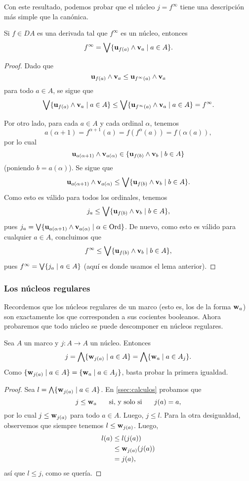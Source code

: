 Con este resultado, podemos probar que el núcleo $j=f^\infty$
tiene una descripción más simple que la canónica.

\begin{lemma}
  Si $f\in DA$ es una derivada tal que $f^\infty$ es un núcleo,
  entonces
  \[
    f^\infty = \bigvee\{\mathbf u_{f(a)}\wedge\mathbf v_{a} \mid a\in A\}
  .\]
\end{lemma}
\begin{proof}
  Dado que
  \[
    \mathbf u_{f(a)}\wedge\mathbf v_{a}\leq \mathbf u_{f^\infty(a)}\wedge\mathbf v_{a}
  \]
  para todo $a\in A$, se sigue que
  \[
    \bigvee\{\mathbf u_{f(a)}\wedge\mathbf v_{a} \mid a\in A\}
    \leq
    \bigvee\{\mathbf u_{f^\infty(a)}\wedge\mathbf v_{a} \mid a\in A\}
    = f^\infty
  .\]

  Por otro lado, para cada $a\in A$ y cada ordinal $\alpha$, tenemos
  \[
    a(\alpha+1)=f^{\alpha+1}(a)=f(f^\alpha(a))=f(\alpha(a))
  ,\]
  por lo cual
  \[
     \mathbf u_{a(\alpha+1)}\wedge\mathbf v_{a(\alpha)}
     \in
     \{\mathbf u_{f(b)}\wedge\mathbf v_{b} \mid b\in A\}
  \]
  (poniendo $b=a(\alpha)$).
  Se sigue que
  \[
     \mathbf u_{a(\alpha+1)}\wedge\mathbf v_{a(\alpha)}
     \leq
     \bigvee\{\mathbf u_{f(b)}\wedge\mathbf v_{b} \mid b\in A\}
  .\]
  Como esto es válido para todos los ordinales, tenemos
  \[
     j_a\leq \bigvee\{\mathbf u_{f(b)}\wedge\mathbf v_{b} \mid b\in A\}
  ,\]
  pues $j_a = \bigvee\{\mathbf u_{a(\alpha+1)}\wedge\mathbf v_{a(\alpha)}
   \mid\alpha\in\mathrm{Ord}\}$.
  De nuevo, como esto es válido para cualquier $a\in A$, concluimos
  que
  \[
     f^\infty\leq \bigvee\{\mathbf u_{f(b)}\wedge\mathbf v_{b} \mid b\in A\}
  ,\]
  pues $f^\infty = \bigvee\{j_a\mid a\in A\}$ (aquí es donde usamos
  el lema anterior).
\end{proof}

\subsubsection{Los núcleos regulares}

Recordemos que los núcleos regulares de un marco
(esto es, los de la forma $\mathbf w_{a}$) son exactamente
los que corresponden a sus cocientes booleanos.
Ahora probaremos que todo núcleo se puede descomponer en
núcleos regulares.

\begin{thm}
    Sea $A$ un marco y $j:A\to A$ un núcleo.
    Entonces
    \[
        j
        = \bigwedge\{\mathbf w_{j(a)}\mid a\in A\}
        = \bigwedge\{\mathbf w_{a}\mid a\in A_j\}
    .\]
    Como $\{\mathbf w_{j(a)}\mid a\in A\}=\{\mathbf w_{a} \mid a\in A_j\}$,
    basta probar la primera igualdad.
\end{thm}
\begin{proof}
    Sea $l = \bigwedge\{\mathbf w_{j(a)}\mid a\in A\}$.
    En \ref{ssec:calculos} probamos que
    \[
        j\leq\mathbf w_{a} \hspace{5mm}\text{ si, y solo si }\hspace{5mm} j(a) = a
    ,\]
    por lo cual $j\leq \mathbf w_{j(a)}$ para todo $a\in A$.
    Luego, $j\leq l$.
    Para la otra desigualdad,
    observemos que siempre tenemos $l\leq\mathbf w_{j(a)}$.
    Luego,
    \begin{align*}
        l(a)
        &\leq l(j(a)) \\
        &\leq \mathbf w_{j(a)}(j(a)) \\
        &= j(a),
    \end{align*}
    así que $l\leq j$, como se quería.
\end{proof}

